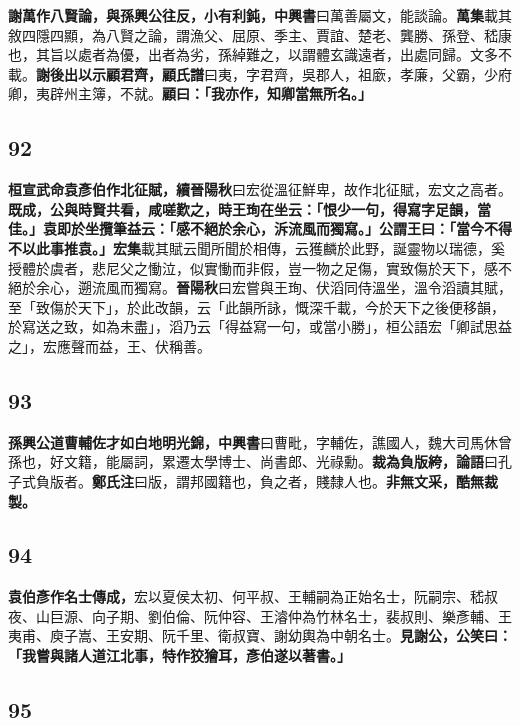 \textbf{謝萬作八賢論，與孫興公往反，小有利鈍，}{\footnotesize \textbf{中興書}曰萬善屬文，能談論。\textbf{萬集}載其敘四隱四顯，為八賢之論，謂漁父、屈原、季主、賈誼、楚老、龔勝、孫登、嵇康也，其旨以處者為優，出者為劣，孫綽難之，以謂體玄識遠者，出處同歸。文多不載。}\textbf{謝後出以示顧君齊，}{\footnotesize \textbf{顧氏譜}曰夷，字君齊，吳郡人，祖廞，孝廉，父霸，少府卿，夷辟州主簿，不就。}\textbf{顧曰：「我亦作，知卿當無所名。」}

\subsection*{92}

\textbf{桓宣武命袁彥伯作北征賦，}{\footnotesize \textbf{續晉陽秋}曰宏從溫征鮮卑，故作北征賦，宏文之高者。}\textbf{既成，公與時賢共看，咸嗟歎之，時王珣在坐云：「恨少一句，得寫字足韻，當佳。」袁即於坐攬筆益云：「感不絕於余心，泝流風而獨寫。」公謂王曰：「當今不得不以此事推袁。」}{\footnotesize \textbf{宏集}載其賦云聞所聞於相傳，云獲麟於此野，誕靈物以瑞德，奚授體於虞者，悲尼父之慟泣，似實慟而非假，豈一物之足傷，實致傷於天下，感不絕於余心，遡流風而獨寫。\textbf{晉陽秋}曰宏嘗與王珣、伏滔同侍溫坐，溫令滔讀其賦，至「致傷於天下」，於此改韻，云「此韻所詠，慨深千載，今於天下之後便移韻，於寫送之致，如為未盡」，滔乃云「得益寫一句，或當小勝」，桓公語宏「卿試思益之」，宏應聲而益，王、伏稱善。}

\subsection*{93}

\textbf{孫興公道曹輔佐才如白地明光錦，}{\footnotesize \textbf{中興書}曰曹毗，字輔佐，譙國人，魏大司馬休曾孫也，好文籍，能屬詞，累遷太學博士、尚書郎、光祿勳。}\textbf{裁為負版絝，}{\footnotesize \textbf{論語}曰孔子式負版者。\textbf{鄭氏注}曰版，謂邦國籍也，負之者，賤隸人也。}\textbf{非無文采，酷無裁製。}

\subsection*{94}

\textbf{袁伯彥作名士傳成，}{\footnotesize 宏以夏侯太初、何平叔、王輔嗣為正始名士，阮嗣宗、嵇叔夜、山巨源、向子期、劉伯倫、阮仲容、王濬仲為竹林名士，裴叔則、樂彥輔、王夷甫、庾子嵩、王安期、阮千里、衛叔寶、謝幼輿為中朝名士。}\textbf{見謝公，公笑曰：「我嘗與諸人道江北事，特作狡獪耳，彥伯遂以著書。」}

\subsection*{95}

